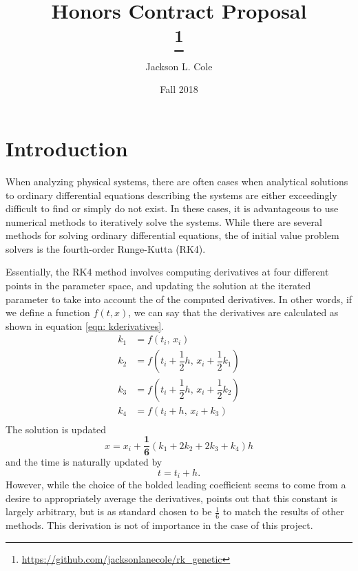 \documentclass[onecolumn,titlepage,letterpaper,10pt]{article}
\title{Honors Contract Proposal\\
\large \theWorkingTitle\thanks{\url{https://github.com/jacksonlanecole/rk_genetic}}}
\author{Jackson L. Cole}
\affil{Department of Physics and Astronomy, Middle Tennessee State University}
\date{Fall 2018}
\newcommand{\functionof}[2]{#1\left(#2\right)}
\newcommand{\paren}[1]{\left(#1\right)}
\begin{document}

\maketitle
\tableofcontents
\listoffigures
\doublespacing

\section{Introduction}
When analyzing physical systems, there are often cases when analytical
solutions to ordinary differential equations describing the systems
are either exceedingly difficult to find or simply do not exist.
In these cases, it is advantageous to use numerical methods to
iteratively solve the systems. While there are several methods for solving ordinary
differential equations, the  of initial value problem solvers is
the fourth-order Runge-Kutta (RK4). \cite{holmes_2018}

Essentially, the RK4 method involves computing derivatives at
four different points in the parameter space, and updating the solution at the
iterated parameter to take into account the 
of the computed
derivatives. In other words, if we define a function $\functionof{f}{t, x}$, we
can say that the derivatives are calculated as shown in equation \eqref{eqn:
kderivatives}.
\begin{equation}
\begin{aligned}
    k_1 &= \functionof{f}{t_i,\, x_i}\\
    k_2 &= \functionof{f}{t_i + \dfrac{1}{2}h,\, x_i + \dfrac{1}{2}k_1}\\
    k_3 &= \functionof{f}{t_i + \dfrac{1}{2}h,\, x_i + \dfrac{1}{2}k_2}\\
    k_4 &= \functionof{f}{       t_i + h,\,        x_i + k_3}\\
    \label{eqn: kderivatives}
\end{aligned}
\end{equation}
The solution is updated
\begin{equation}
    x   = x_i + \mathbf{\dfrac{1}{6}}\paren{k_1 + 2k_2 + 2k_3 + k_4}h
\end{equation}
and the time is naturally updated by
\begin{equation}
    \label{eqn: time update}
    t = t_i + h.
\end{equation}
However, while the choice of the bolded leading coefficient seems to come
from a desire to
appropriately average the derivatives, \citet{holmes_2018} points out that
this constant is largely arbitrary, but is as standard chosen to be
$\frac{1}{6}$ to match the results of other methods. This derivation is not of
importance in the case of this project.
\end{document}

